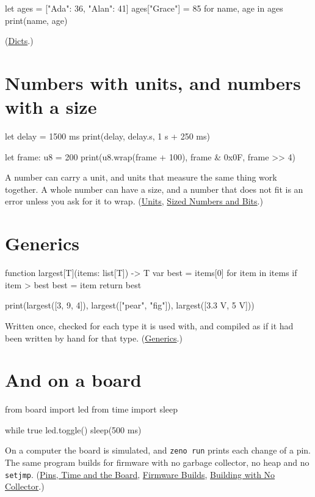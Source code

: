\begin{zeno}
let ages = ["Ada": 36, "Alan": 41]
ages["Grace"] = 85
for name, age in ages {
    print(name, age)
}
\end{zeno}

(\hyperref[ch-dicts]{Dicts}.)

\section{Numbers with units, and numbers with a size}

\begin{zeno}
let delay = 1500 ms
print(delay, delay.s, 1 s + 250 ms)

let frame: u8 = 200
print(u8.wrap(frame + 100), frame & 0x0F, frame >> 4)
\end{zeno}

A number can carry a unit, and units that measure the same thing work
together. A whole number can have a size, and a number that does not
fit is an error unless you ask for it to wrap.
(\hyperref[ch-units]{Units}, \hyperref[ch-sized-numbers]{Sized Numbers
and Bits}.)

\section{Generics}

\begin{zeno}
function largest[T](items: list[T]) -> T {
    var best = items[0]
    for item in items {
        if item > best {
            best = item
        }
    }
    return best
}

print(largest([3, 9, 4]), largest(["pear", "fig"]), largest([3.3 V, 5 V]))
\end{zeno}

Written once, checked for each type it is used with, and compiled as
if it had been written by hand for that type.
(\hyperref[ch-generics]{Generics}.)

\section{And on a board}

\begin{zeno}[file=blink.zeno, cmd=zeno check blink.zeno]
from board import led
from time import sleep

while true {
    led.toggle()
    sleep(500 ms)
}
\end{zeno}

On a computer the board is simulated, and \verb|zeno run| prints each
change of a pin. The same program builds for firmware with no garbage
collector, no heap and no \verb|setjmp|. (\hyperref[ch-board]{Pins,
Time and the Board}, \hyperref[ch-firmware]{Firmware Builds},
\hyperref[ch-no-collector]{Building with No Collector}.)

